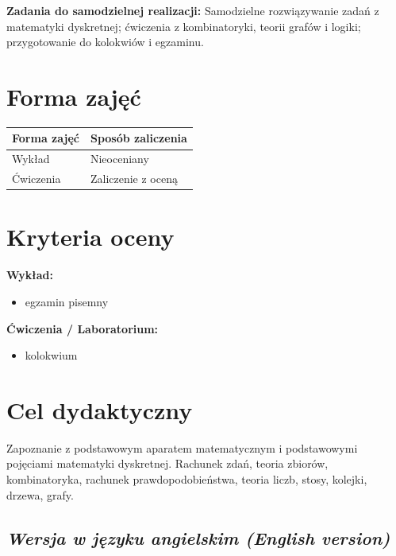 \documentclass[12pt, a4paper]{article}
\newcommand{\thdrule}{\noalign{\global\setlength{\extrarowheight}{0pt}}}
\newcommand{\thdend}{\noalign{\global\setlength{\extrarowheight}{3pt}}}
\begin{document}
\vspace{4pt}
\noindent\textbf{Zadania do samodzielnej realizacji:} Samodzielne rozwiązywanie zadań z matematyki dyskretnej; ćwiczenia z kombinatoryki, teorii grafów i logiki; przygotowanie do kolokwiów i egzaminu.

\section{Forma zajęć}

\begin{center}
{\scriptsize
\begin{tabular}{m{5cm}m{8cm}}
\thdrule\toprule
\rowcolor{pjatkRed} {\color{white}\textbf{Forma zajęć}} & {\color{white}\textbf{Sposób zaliczenia}} \\
\midrule\thdend
  \rowcolor{tableRowLight} Wykład & Nieoceniany \\
  \rowcolor{tableRowAlt} Ćwiczenia & Zaliczenie z oceną \\
\bottomrule
\end{tabular}}
\end{center}

\section{Kryteria oceny}

\textbf{Wykład:}
\begin{itemize}
  \item egzamin pisemny
\end{itemize}
\vspace{4pt}
\textbf{Ćwiczenia / Laboratorium:}
\begin{itemize}
  \item kolokwium
\end{itemize}


\section{Cel dydaktyczny}

Zapoznanie z podstawowym aparatem matematycznym i podstawowymi pojęciami matematyki dyskretnej. Rachunek zdań, teoria zbiorów, kombinatoryka, rachunek prawdopodobieństwa, teoria liczb, stosy, kolejki, drzewa, grafy.

\subsection*{\textit{Wersja w języku angielskim (English version)}}
\end{document}
